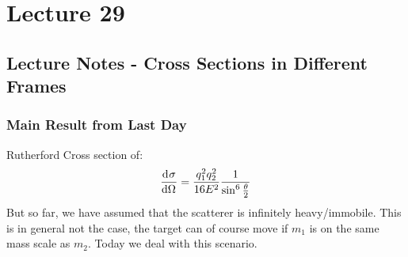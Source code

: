 \documentclass[../PHYS306Notes.tex]{subfiles}
\begin{document}
\section{Lecture 29}
\subsection{Lecture Notes - Cross Sections in Different Frames}
\subsubsection{Main Result from Last Day}
Rutherford Cross section of:
\[\dod{\sigma}{\Omega} = \frac{q_1^2q_2^2}{16E^2}\frac{1}{\sin^6\frac{\theta}{2}}\]
But so far, we have assumed that the scatterer is infinitely heavy/immobile. This is in general not the case, the target can of course move if $m_1$ is on the same mass scale as $m_2$. Today we deal with this scenario.
\end{document}
